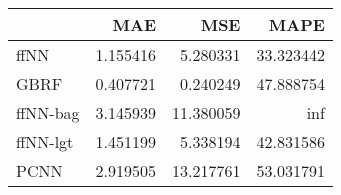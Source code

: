 \begin{tabular}{lrrr}
\toprule
{} &       MAE &        MSE &       MAPE \\
\midrule
ffNN     &  1.155416 &   5.280331 &  33.323442 \\
GBRF     &  0.407721 &   0.240249 &  47.888754 \\
ffNN-bag &  3.145939 &  11.380059 &        inf \\
ffNN-lgt &  1.451199 &   5.338194 &  42.831586 \\
PCNN     &  2.919505 &  13.217761 &  53.031791 \\
\bottomrule
\end{tabular}
